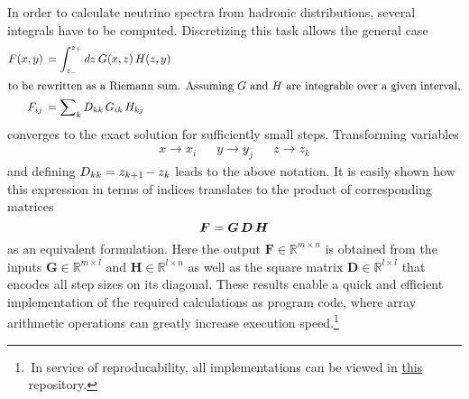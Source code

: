 In order to calculate neutrino spectra from hadronic distributions, several integrals have to be computed. Discretizing
this task allows the general case
\begin{align*}
	F(x, y) \kern+1.5pt &= \int_{z_{-}}^{z_{+}} dz \: G(x, z) \, H(z, y) \\
	\intertext{to be rewritten as a Riemann sum. Assuming $G$ and $H$ are integrable over a given interval,}
	F_{ij} \kern+1.8pt &= \sum\nolimits_k D_{kk} \, G_{ik} \, H_{kj}
\end{align*}
converges to the exact solution for sufficiently small steps. Transforming variables
\begin{align*}
	&&&& x \rightarrow x_i && y \rightarrow y_j && z \rightarrow z_k &&&&
\end{align*}
and defining $D_{kk} = z_{k+1} \kern-1.0pt - z_k$ leads to the above notation. It is easily shown how this expression in terms of
indices translates to the product of corresponding matrices
\begin{equation*}
	\bm{F} \kern+0.6pt = \bm{G} \, \bm{D} \, \bm{H}
\end{equation*}
as an equivalent formulation. Here the output $\bm{F} \in \mathbb{R}^{m \times n}$ is obtained from the inputs
$\bm{G} \in \mathbb{R}^{m \times l}$ and $\bm{H} \in \mathbb{R}^{l \times n}$ as well as the square matrix
$\bm{D} \in \mathbb{R}^{l \times l}$ that encodes all step sizes on its diagonal. These results enable a quick and
efficient implementation of the required calculations as program code, where array arithmetic operations can greatly
increase execution speed.\footnote{$\,$In service of reproducability, all implementations can be viewed in
\href{https://github.com/fritzali/bachelor}{this} repository.}
